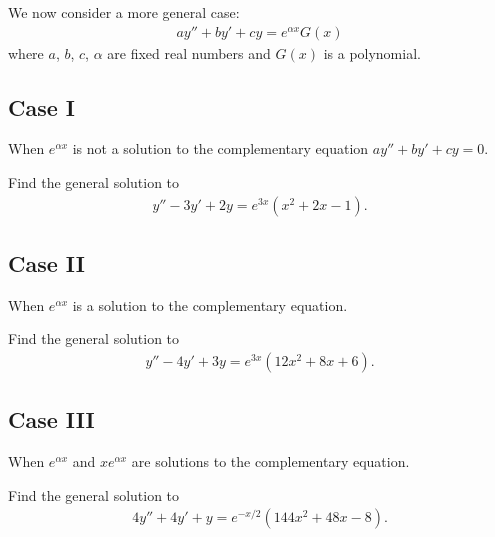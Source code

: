 \documentclass[12pt,a4paper]{article}
\newcounter{example}[section]
\begin{document}
We now consider a more general case:
	\begin{align*}
	ay'' + by' + cy = e^{\alpha x} G(x)
	\end{align*}
where $a$, $b$, $c$, $\alpha$ are fixed real numbers and $G(x)$ is a polynomial.

\subsection{Case I}

When $e^{\alpha x}$ is not a solution to the complementary equation $ay'' + by' + cy = 0$.

\begin{example}
Find the general solution to
	\begin{align*}
	y'' - 3y' + 2y = e^{3x} (x^2 + 2x - 1) .
	\end{align*}
\end{example}

\newpage

\phantom{2}

\newpage

\subsection{Case II}

When $e^{\alpha x}$ is a solution to the complementary equation.

\begin{example}
Find the general solution to
	\begin{align*}
	y'' - 4y' + 3y = e^{3x} (12x^2 + 8x + 6) .
	\end{align*}
\end{example}

\newpage

\phantom{1}

\newpage

\subsection{Case III}

When $e^{\alpha x}$ and $xe^{\alpha x}$ are solutions to the complementary equation.

\begin{example}
Find the general solution to
	\begin{align*}
	4y'' + 4y' + y = e^{-x/2} (144x^2 + 48 x - 8) .
	\end{align*}
\end{example}
\end{document}
